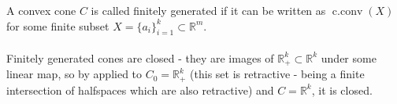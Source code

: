 \begin{defn}\label{defn:017-fg-cones}
	A convex cone $C$ is called finitely generated if it can be written as $\operatorname{c.conv}(X)$ for some finite subset $X=\{a_i\}_{i=1}^k\subset \mathbb{R}^m$.
\end{defn}

\paragraph{}Finitely generated cones are closed - they are images of $\mathbb{R}_+^k\subset \mathbb{R}^k$ under some linear map, so by  applied to $C_0=\mathbb{R}_+^k$ (this set is retractive - being a finite intersection of halfspaces which are also retractive) and $C=\mathbb{R}^k$, it is closed.
